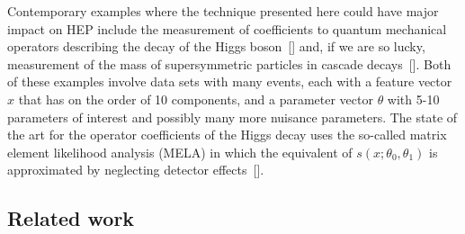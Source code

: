 \documentclass[aoas,preprint]{imsart}
\newcommand{\citek}[1]{[\cite{#1}]}
\numberwithin{equation}{section}
\theoremstyle{plain}
\begin{document}
Contemporary examples where the technique presented here could have major impact on HEP include the measurement of coefficients to quantum mechanical operators describing the decay of the Higgs boson~\citek{Chen:2014pia} and, if we are so lucky, measurement of the mass of supersymmetric particles in cascade decays~\citek{Allanach:2000kt}.  Both of these examples involve data sets with many events, each with a feature vector $x$ that has on the order of 10 components, and a parameter vector $\theta$ with 5-10 parameters of interest and possibly many more nuisance parameters. 
The state of the art for the operator coefficients of the Higgs decay uses the so-called matrix element likelihood analysis (MELA) in which the equivalent of $s(x; \theta_0, \theta_1)$ is approximated by neglecting detector effects~\citek{Bolognesi:2012mm}. 

\bigskip

\subsection{Related work}\label{S:Related}

\end{document}
